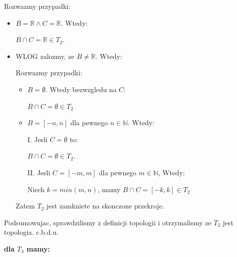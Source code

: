 \documentclass{article}
\begin{document}
\begin{enumerate}
\begin{enumerate}[label=(\alph*')]
                Rozwazmy przypadki:

                \begin{itemize}%

                    \item $B = \mathbb{R} \land C = \mathbb{R}$. Wtedy:

                        $B \cap C = \mathbb{R} \in T_{2}$.
                    \item WLOG zalozmy, ze $B \neq \mathbb{R}$. Wtedy:

                        Rozwazmy przypadki:
                        \begin{itemize}%

                            \item $B = \emptyset$. Wtedy bezwzgledu na $C$:

                                $B \cap C = \emptyset \in T_{2}$
                            \item $B = [-n,n]$ dla pewnego $n \in \mathbb{N}$. Wtedy:

                                I. Jesli $C = \emptyset$ to:

                                $B\cap C = \emptyset \in T_{2}$.
                                \vspace{5mm}

                                II. Jesli $C = [-m,m]$ dla pewnego $m \in \mathbb{N}$, Wtedy:

                                Niech $k = min(m, n)$, mamy $B\cap C = [-k,k] \in T_{2}$
                        \end{itemize}%
                        \vspace{5mm}

                        Zatem $T_{2}$ jest zamkniete na skonczone przekroje.  
                \end{itemize}%

                Podsumowujac, sprawdzilismy z definicji topologii i otrzymalismy ze $T_{2}$ jest topologia. c.b.d.u.

        \end{enumerate}%

        \textbf{dla $T_{3}$ mamy:}

        \begin{enumerate}[label=(\alph*')] %


\end{enumerate}
\end{enumerate}
\end{document}
